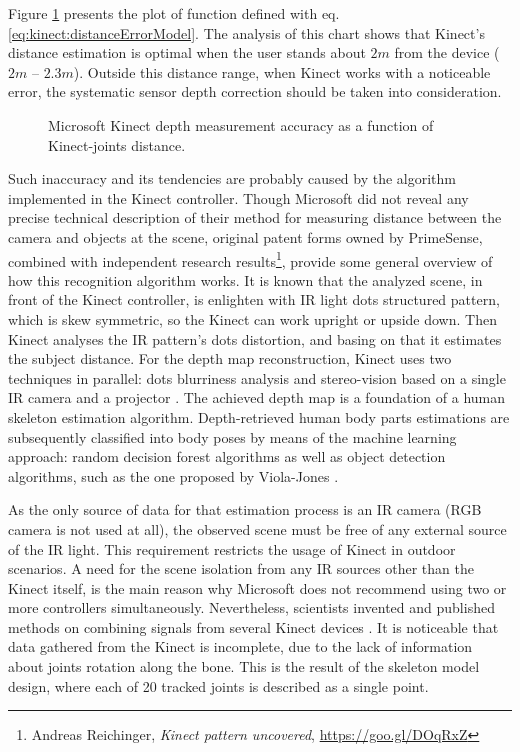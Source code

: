 \documentclass[sensors,article,submit,moreauthors,pdftex,10pt,a4paper]{mdpi}
\begin{document}
Figure \ref{fig:kinect:distanceAccuracy} presents the plot of function defined with eq. \ref{eq:kinect:distanceErrorModel}. The analysis of this chart shows that Kinect’s distance estimation is optimal when the user stands about $2m$ from the device ($2m$ – $2.3m$). Outside this distance range, when Kinect works with a noticeable error, the systematic sensor depth correction should be taken into consideration.

\begin{figure}[H] %
	\centering	
											
	\caption{Microsoft Kinect depth measurement accuracy as a function of Kinect-joints distance.}
	\label{fig:kinect:distanceAccuracy}
\end{figure}

Such inaccuracy and its tendencies are probably caused by the algorithm implemented in the Kinect controller. Though Microsoft did not reveal any precise technical description of their method for measuring distance between the camera and objects at the scene, original patent forms \cite{patent:20100118123,patent:20100020078,patent:20080106746} owned by PrimeSense, combined with independent research results\footnote{Andreas Reichinger, \textit{Kinect pattern uncovered}, \url{https://goo.gl/DOqRxZ}}, provide some general overview of how this recognition algorithm works. It is known that the analyzed scene, in front of the Kinect controller, is enlighten with IR light dots structured pattern, which is skew symmetric, so the Kinect can work upright or upside down. Then Kinect analyses the IR pattern’s dots distortion, and basing on that it estimates the subject distance. For the depth map reconstruction, Kinect uses two techniques in parallel: dots blurriness analysis \cite{Fofi2004} and stereo-vision based on a single IR camera and a projector \cite{Rzeszotarski2006}. The achieved depth map is a foundation of a human skeleton estimation algorithm. Depth-retrieved human body parts estimations are subsequently classified into body poses by means of the machine learning approach: random decision forest algorithms as well as object detection algorithms, such as the one proposed by Viola-Jones \cite{Shotton2008, Shotton2011a}. 

As the only source of data for that estimation process is an IR camera (RGB camera is not used at all), the observed scene must be free of any external source of the IR light. This requirement restricts the usage of Kinect in outdoor scenarios. A need for the scene isolation from any IR sources other than the Kinect itself, is the main reason why Microsoft does not recommend using two or more controllers simultaneously. Nevertheless, scientists invented and published methods on combining signals from several Kinect devices \cite{Asteriadis2013,Kitsikidis2011,Schroder2011}. It is noticeable that data gathered from the Kinect is incomplete, due to the lack of information about joints rotation along the bone. This is the result of the skeleton model design, where each of 20 tracked joints is described as a single point.
\end{document}
